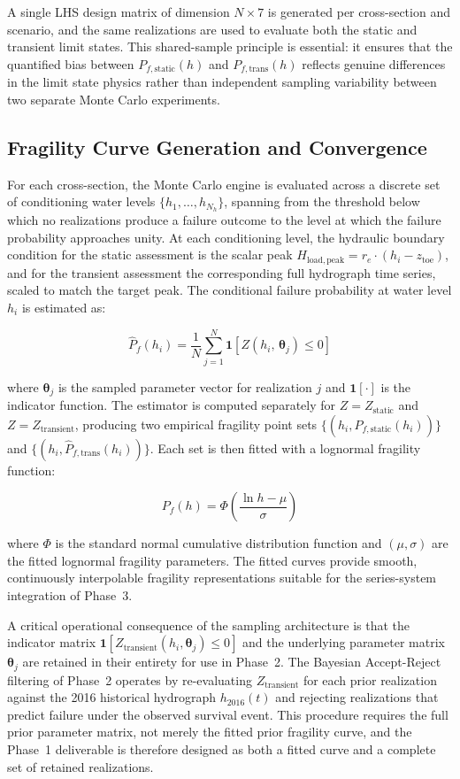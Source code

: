 A single LHS design matrix of dimension $N \times 7$ is generated per cross-section and scenario, and the same realizations are used to evaluate both the static and transient limit states. This shared-sample principle is essential: it ensures that the quantified bias between $P_{f,\mathrm{static}}(h)$ and $P_{f,\mathrm{trans}}(h)$ reflects genuine differences in the limit state physics rather than independent sampling variability between two separate Monte Carlo experiments.

\subsection{Fragility Curve Generation and Convergence}
\label{subsec: Fragility Curve Generation and Convergence}

For each cross-section, the Monte Carlo engine is evaluated across a discrete set of conditioning water levels $\{h_1,\dots,h_{N_h}\}$, spanning from the threshold below which no realizations produce a failure outcome to the level at which the failure probability approaches unity. At each conditioning level, the hydraulic boundary condition for the static assessment is the scalar peak $H_\mathrm{load,peak} = r_e \cdot (h_i - z_\mathrm{toe})$, and for the transient assessment the corresponding full hydrograph time series, scaled to match the target peak. The conditional failure probability at water level $h_i$ is estimated as:

$$\hat{P}_f(h_i) = \frac{1}{N}\sum_{j=1}^{N}\mathbf{1}\!\left[Z(h_i,\,\boldsymbol{\theta}_j) \leq 0\right]$$

where $\boldsymbol{\theta}_j$ is the sampled parameter vector for realization $j$ and $\mathbf{1}[\cdot]$ is the indicator function. The estimator is computed separately for $Z = Z_\mathrm{static}$ and $Z = Z_\mathrm{transient}$, producing two empirical fragility point sets $\{(h_i, \hat{P}_{f,\mathrm{static}}(h_i))\}$ and $\{(h_i, \hat{P}_{f,\mathrm{trans}}(h_i))\}$. Each set is then fitted with a lognormal fragility function:

$$P_f(h) = \Phi\!\left(\frac{\ln h - \mu}{\sigma}\right)$$

where $\Phi$ is the standard normal cumulative distribution function and $(\mu, \sigma)$ are the fitted lognormal fragility parameters. The fitted curves provide smooth, continuously interpolable fragility representations suitable for the series-system integration of Phase~3.

A critical operational consequence of the sampling architecture is that the indicator matrix $\mathbf{1}[Z_\mathrm{transient}(h_i, \boldsymbol{\theta}_j) \leq 0]$ and the underlying parameter matrix $\boldsymbol{\theta}_j$ are retained in their entirety for use in Phase~2. The Bayesian Accept-Reject filtering of Phase~2 operates by re-evaluating $Z_\mathrm{transient}$ for each prior realization against the 2016 historical hydrograph $h_{2016}(t)$ and rejecting realizations that predict failure under the observed survival event. This procedure requires the full prior parameter matrix, not merely the fitted prior fragility curve, and the Phase~1 deliverable is therefore designed as both a fitted curve and a complete set of retained realizations.

